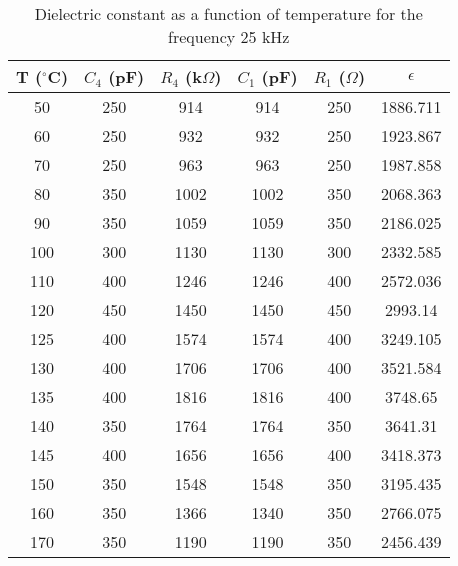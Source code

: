 \begin{table}[H]
    \centering
    \begin{tabular}{|c|c|c|c|c|c|}
    \hline
    T ($^\circ$C) & $C_4$ (pF) & $R_4$ (k$\Omega$) & $C_1$ (pF) & $R_1$ ($\Omega$) & $\epsilon$ \\ \hline
    50 & 250 & 914 & 914 & 250 & 1886.711 \\ \hline
    60 & 250 & 932 & 932 & 250 & 1923.867 \\ \hline
    70 & 250 & 963 & 963 & 250 & 1987.858 \\ \hline
    80 & 350 & 1002 & 1002 & 350 & 2068.363 \\ \hline
    90 & 350 & 1059 & 1059 & 350 & 2186.025 \\ \hline
    100 & 300 & 1130 & 1130 & 300 & 2332.585 \\ \hline
    110 & 400 & 1246 & 1246 & 400 & 2572.036 \\ \hline
    120 & 450 & 1450 & 1450 & 450 & 2993.14 \\ \hline
    125 & 400 & 1574 & 1574 & 400 & 3249.105 \\ \hline
    130 & 400 & 1706 & 1706 & 400 & 3521.584 \\ \hline
    135 & 400 & 1816 & 1816 & 400 & 3748.65 \\ \hline
    140 & 350 & 1764 & 1764 & 350 & 3641.31 \\ \hline
    145 & 400 & 1656 & 1656 & 400 & 3418.373 \\ \hline
    150 & 350 & 1548 & 1548 & 350 & 3195.435 \\ \hline
    160 & 350 & 1366 & 1340 & 350 & 2766.075 \\ \hline
    170 & 350 & 1190 & 1190 & 350 & 2456.439 \\ \hline
    \end{tabular}
    \caption{Dielectric constant as a function
    of temperature for the frequency 25 kHz}
    \label{tab:f2}
\end{table}